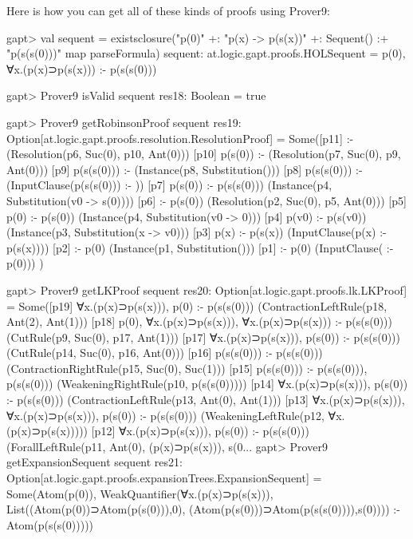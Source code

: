 \documentclass[a4paper,11pt]{article}
\begin{document}
Here is how you can get all of these kinds of proofs using Prover9:
\begin{clilisting}
gapt> val sequent = existsclosure("p(0)" +: "p(x) -> p(s(x))" +: Sequent()                                 :+ "p(s(s(0)))" map parseFormula)
sequent: at.logic.gapt.proofs.HOLSequent = p(0), ∀x.(p(x)⊃p(s(x))) :- p(s(s(0)))

\end{clilisting}

\begin{clilisting}
gapt> Prover9 isValid sequent
res18: Boolean = true

gapt> Prover9 getRobinsonProof sequent
res19: Option[at.logic.gapt.proofs.resolution.ResolutionProof] =
Some([p11]  :-     (Resolution(p6, Suc(0), p10, Ant(0)))
[p10] p(s(0)) :-     (Resolution(p7, Suc(0), p9, Ant(0)))
[p9] p(s(s(0))) :-     (Instance(p8, Substitution()))
[p8] p(s(s(0))) :-     (InputClause(p(s(s(0))) :- ))
[p7] p(s(0)) :- p(s(s(0)))    (Instance(p4, Substitution(v0 -> s(0))))
[p6]  :- p(s(0))    (Resolution(p2, Suc(0), p5, Ant(0)))
[p5] p(0) :- p(s(0))    (Instance(p4, Substitution(v0 -> 0)))
[p4] p(v0) :- p(s(v0))    (Instance(p3, Substitution(x -> v0)))
[p3] p(x) :- p(s(x))    (InputClause(p(x) :- p(s(x))))
[p2]  :- p(0)    (Instance(p1, Substitution()))
[p1]  :- p(0)    (InputClause( :- p(0)))
)

gapt> Prover9 getLKProof sequent
res20: Option[at.logic.gapt.proofs.lk.LKProof] =
Some([p19] ∀x.(p(x)⊃p(s(x))), p(0) :- p(s(s(0)))    (ContractionLeftRule(p18, Ant(2), Ant(1)))
[p18] p(0), ∀x.(p(x)⊃p(s(x))), ∀x.(p(x)⊃p(s(x))) :- p(s(s(0)))    (CutRule(p9, Suc(0), p17, Ant(1)))
[p17] ∀x.(p(x)⊃p(s(x))), p(s(0)) :- p(s(s(0)))    (CutRule(p14, Suc(0), p16, Ant(0)))
[p16] p(s(s(0))) :- p(s(s(0)))    (ContractionRightRule(p15, Suc(0), Suc(1)))
[p15] p(s(s(0))) :- p(s(s(0))), p(s(s(0)))    (WeakeningRightRule(p10, p(s(s(0)))))
[p14] ∀x.(p(x)⊃p(s(x))), p(s(0)) :- p(s(s(0)))    (ContractionLeftRule(p13, Ant(0), Ant(1)))
[p13] ∀x.(p(x)⊃p(s(x))), ∀x.(p(x)⊃p(s(x))), p(s(0)) :- p(s(s(0)))    (WeakeningLeftRule(p12, ∀x.(p(x)⊃p(s(x)))))
[p12] ∀x.(p(x)⊃p(s(x))), p(s(0)) :- p(s(s(0)))    (ForallLeftRule(p11, Ant(0), (p(x)⊃p(s(x))), s(0...
gapt> Prover9 getExpansionSequent sequent
res21: Option[at.logic.gapt.proofs.expansionTrees.ExpansionSequent] = Some(Atom(p(0)), WeakQuantifier(∀x.(p(x)⊃p(s(x))), List((Atom(p(0))⊃Atom(p(s(0))),0), (Atom(p(s(0)))⊃Atom(p(s(s(0)))),s(0)))) :- Atom(p(s(s(0)))))

\end{clilisting}
\end{document}
